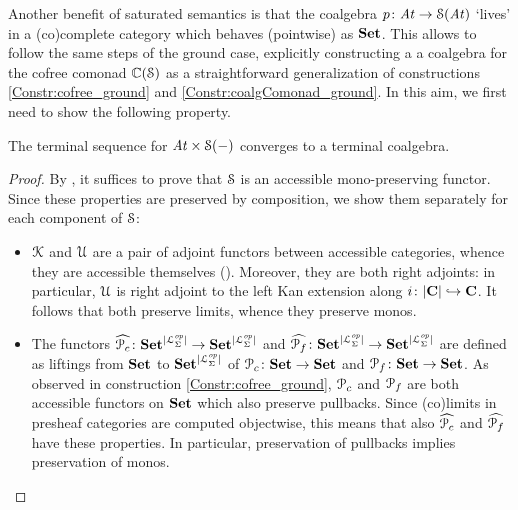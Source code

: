 Another benefit of saturated semantics is that the coalgebra $p \colon \mathit{At} \to \mathcal{S}(\mathit{At})$ `lives' in a (co)complete category which behaves (pointwise) as $\mathbf{Set}$. This allows to follow the same steps of the ground case, explicitly constructing a a coalgebra for the cofree comonad $\mathbb{C}(\mathcal{S})$ as a straightforward generalization of constructions \ref{Constr:cofree_ground} and \ref{Constr:coalgComonad_ground}. In this aim, we first need to show the following property.

\begin{proposition}\label{Prop:terminalForKPPU_converges} The terminal sequence for $\mathit{At} \times \mathcal{S} (-)$ converges to a terminal coalgebra. \end{proposition}
\begin{proof} By \cite[Th. 7]{Worrell99}, it suffices to prove that $\mathcal{S}$ is an accessible mono-preserving functor. Since these properties are preserved by composition, we show them separately for each component of $\mathcal{S}$:
\begin{itemize}
  \item $\mathcal{K}$ and $\mathcal{U}$ are a pair of adjoint functors between accessible categories, whence they are accessible themselves (\cite[Prop. 2.23]{adamek/rosicky:1994}). Moreover, they are both right adjoints: in particular, $\mathcal{U}$ is right adjoint to the left Kan extension along $i \colon |\mathbf{C}| \hookrightarrow \mathbf{C}$. It follows that both preserve limits, whence they preserve monos.
  \item The functors $\widehat{\mathcal P_c}\colon \mathbf{Set}^{|\mathcal{L}^{\mathit{op}}_{\Sigma}|} \to\mathbf{Set}^{|\mathcal{L}^{\mathit{op}}_{\Sigma}|}$ and $\widehat{\mathcal P_f}\colon \mathbf{Set}^{|\mathcal{L}^{\mathit{op}}_{\Sigma}|} \to\mathbf{Set}^{|\mathcal{L}^{\mathit{op}}_{\Sigma}|}$ are defined as liftings from $\mathbf{Set}$ to $\mathbf{Set}^{|\mathcal{L}^{\mathit{op}}_{\Sigma}|}$ of $\mathcal P_ c \colon \mathbf{Set} \to \mathbf{Set}$ and $\mathcal P_f \colon \mathbf{Set} \to \mathbf{Set}$. As observed in construction \ref{Constr:cofree_ground}, $\mathcal P_c$ and $\mathcal P_f$ are both accessible functors on $\mathbf{Set}$ which also preserve pullbacks. Since (co)limits in presheaf categories are computed objectwise, this means that also $\widehat{\mathcal P_c}$ and $\widehat{\mathcal P_f}$ have these properties. In particular, preservation of pullbacks implies preservation of monos.
\end{itemize}
\end{proof}

